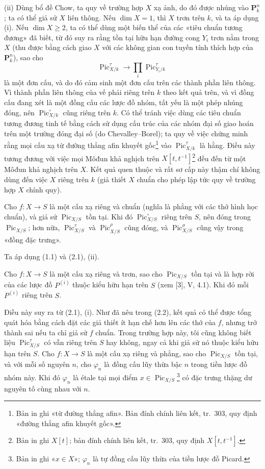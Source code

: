 (ii) Dùng bổ đề Chow, ta quy về trường hợp $X$ xạ ảnh, do đó được nhúng vào
$\mathbf P_k^n$; ta có thể giả sử $X$ liên thông. Nếu $\dim X=1$, thì $X$ trơn
trên $k$, và ta áp dụng (i). Nếu $\dim X\geq2$, ta có thể dùng một biến thể của
các «tiêu chuẩn tương đương» đã biết, từ đó suy ra rằng tồn tại hữu hạn đường
cong $Y_i$ trơn nằm trong $X$ (thu được bằng cách giao $X$ với các không gian
con tuyến tính thích hợp của $\mathbf P_k^n$), sao cho
\[
\operatorname{Pic}_{X/k}^\tau\longrightarrow
\prod_i\operatorname{Pic}_{Y_i/k}^\tau
\]
là một đơn cấu, và do đó cảm sinh một đơn cấu trên các thành phần liên thông.
Vì thành phần liên thông của vế phải riêng trên $k$ theo kết quả trên, và vì
đồng cấu đang xét là một đồng cấu các lược đồ nhóm, tất yếu là một phép nhúng
đóng, nên $\operatorname{Pic}_{X/k}^\circ$ cũng riêng trên $k$. Có thể tránh
việc dùng các tiêu chuẩn tương đương tinh tế bằng cách sử dụng cấu trúc của các
nhóm đại số giao hoán trên một trường đóng đại số (do Chevalley--Borel); ta quy
về việc chứng minh rằng mọi cấu xạ từ đường thẳng afin khuyết
gốc\footnote{Bản in ghi «từ đường thẳng afin». Bản đính chính liên kết,
tr.~303, quy định «đường thẳng afin khuyết gốc».} vào
$\operatorname{Pic}_{X/k}^\tau$ là hằng. Điều này tương đương với việc mọi
Môđun khả nghịch trên $X[t,t^{-1}]$\footnote{Bản in ghi $X[t]$; bản đính
chính liên kết, tr.~303, quy định $X[t,t^{-1}]$.} đều đến từ một Môđun khả
nghịch trên $X$. Kết quả quen thuộc và rất sơ cấp này thậm chí không dùng đến
việc $X$ riêng trên $k$ (giả thiết $X$ chuẩn cho phép lập tức quy về trường hợp
$X$ chính quy).

 Cho $f:X\longrightarrow S$ là một cấu xạ riêng và chuẩn
(nghĩa là phẳng với các thớ hình học chuẩn), và giả sử
$\operatorname{Pic}_{X/S}$ tồn tại. Khi đó $\operatorname{Pic}_{X/S}^\circ$
riêng trên $S$, nên đóng trong $\operatorname{Pic}_{X/S}$; hơn nữa,
$\operatorname{Pic}_{X/S}^\tau$ và $\operatorname{Pic}_{X/S}^\rho$ cũng đóng,
và $\operatorname{Pic}_{X/S}^\sigma$ cũng vậy trong «đồng đặc trưng».

Ta áp dụng (1.1) và (2.1), (ii).

 Cho $f:X\longrightarrow S$ là một cấu xạ riêng và trơn,
sao cho $\operatorname{Pic}_{X/S}$ tồn tại và là hợp rời của các lược đồ
$P^{(i)}$ thuộc kiểu hữu hạn trên $S$ (xem [3], V, 4.1). Khi đó mỗi $P^{(i)}$
riêng trên $S$.

Điều này suy ra từ (2.1), (i). Như đã nêu trong (2.2), kết quả có thể được tổng
quát hóa bằng cách đặt các giả thiết ít hạn chế hơn lên các thớ của $f$, nhưng
trở thành sai nếu ta chỉ giả sử $f$ chuẩn. Trong trường hợp này, tôi cũng không
biết liệu $\operatorname{Pic}_{X/S}^\tau$ có vẫn riêng trên $S$ hay không,
ngay cả khi giả sử nó thuộc kiểu hữu hạn trên $S$.
 Cho $f:X\longrightarrow S$ là một cấu xạ riêng và
phẳng, sao cho $\operatorname{Pic}_{X/S}$ tồn tại, và với mỗi số nguyên $n$,
cho $\varphi_n$ là đồng cấu lũy thừa bậc $n$ trong tiền lược đồ nhóm này. Khi
đó $\varphi_n$ là étale tại mọi điểm
$x\in\operatorname{Pic}_{X/S}$\footnote{Bản in ghi «$x\in X$»;
$\varphi_n$ là tự đồng cấu lũy thừa của tiền lược đồ Picard.} có đặc trưng
thặng dư nguyên tố cùng nhau với $n$.

